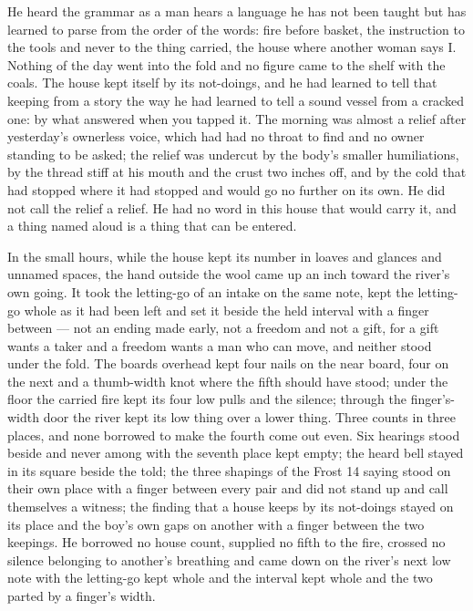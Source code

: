 He heard the grammar as a man hears a language he has not been taught but has learned to parse from the order of the words: fire before basket, the instruction to the tools and never to the thing carried, the house where another woman says I. Nothing of the day went into the fold and no figure came to the shelf with the coals. The house kept itself by its not-doings, and he had learned to tell that keeping from a story the way he had learned to tell a sound vessel from a cracked one: by what answered when you tapped it. The morning was almost a relief after yesterday's ownerless voice, which had had no throat to find and no owner standing to be asked; the relief was undercut by the body's smaller humiliations, by the thread stiff at his mouth and the crust two inches off, and by the cold that had stopped where it had stopped and would go no further on its own. He did not call the relief a relief. He had no word in this house that would carry it, and a thing named aloud is a thing that can be entered.

\scenebreak

In the small hours, while the house kept its number in loaves and glances and unnamed spaces, the hand outside the wool came up an inch toward the river's own going. It took the letting-go of an intake on the same note, kept the letting-go whole as it had been left and set it beside the held interval with a finger between --- not an ending made early, not a freedom and not a gift, for a gift wants a taker and a freedom wants a man who can move, and neither stood under the fold. The boards overhead kept four nails on the near board, four on the next and a thumb-width knot where the fifth should have stood; under the floor the carried fire kept its four low pulls and the silence; through the finger's-width door the river kept its low thing over a lower thing. Three counts in three places, and none borrowed to make the fourth come out even. Six hearings stood beside and never among with the seventh place kept empty; the heard bell stayed in its square beside the told; the three shapings of the Frost 14 saying stood on their own place with a finger between every pair and did not stand up and call themselves a witness; the finding that a house keeps by its not-doings stayed on its place and the boy's own gaps on another with a finger between the two keepings. He borrowed no house count, supplied no fifth to the fire, crossed no silence belonging to another's breathing and came down on the river's next low note with the letting-go kept whole and the interval kept whole and the two parted by a finger's width.

